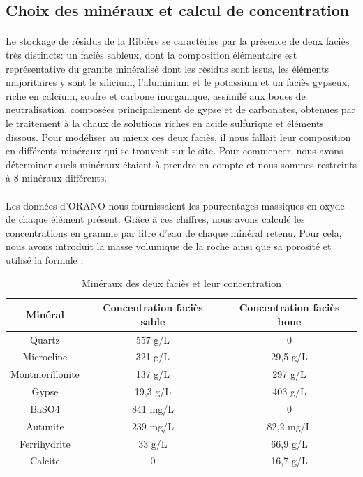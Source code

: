 \documentclass{article}
\begin{document}
\subsection{Choix des minéraux et calcul de concentration}

\paragraph{} Le stockage de résidus de la Ribière se caractérise par la présence de deux faciès très distincts: un faciès sableux, dont la composition élémentaire est représentative du granite minéralisé dont les résidus sont issus, les éléments majoritaires y sont le silicium, l’aluminium et le potassium et un faciès gypseux, riche en calcium, soufre et carbone inorganique, assimilé aux boues de neutralisation, composées principalement de gypse et de carbonates, obtenues par le traitement à la chaux de solutions riches en acide sulfurique et éléments dissous. Pour modéliser au mieux ces deux faciès, il nous fallait leur composition en différents minéraux qui se trouvent sur le site. Pour commencer, nous avons déterminer quels minéraux étaient à prendre en compte et nous sommes restreints à 8 minéraux différents. %
\paragraph{} Les données d'ORANO nous fournissaient les pourcentages massiques en oxyde de chaque élément présent. Grâce à ces chiffres, nous avons calculé les concentrations en gramme par litre d'eau de chaque minéral retenu. Pour cela, nous avons introduit la masse volumique de la roche ainsi que sa porosité et utilisé la formule : %

\begin{table}[H]
    \centering    
    \caption{Minéraux des deux faciès et leur concentration }
    \begin{tabular}{ |c |c |c |}
        \hline
         \textbf{Minéral} & \textbf{Concentration faciès sable} & \textbf{Concentration faciès boue}\\ 
         \hline
         Quartz & 557 g/L & 0 \\ 
         \hline
         Microcline & 321 g/L & 29,5 g/L  \\
         \hline
         Montmorillonite & 137 g/L & 297 g/L  \\
         \hline
         Gypse & 19,3 g/L & 403 g/L  \\
         \hline
         BaSO4 & 841 mg/L & 0  \\
          \hline
         Autunite & 239 mg/L & 82,2 mg/L  \\
          \hline
         Ferrihydrite & 33 g/L & 66,9 g/L  \\
          \hline
         Calcite & 0 & 16,7 g/L \\
         \hline
    \end{tabular}

    \label{tab:mineraux_concentrations}
\end{table}
\end{document}

